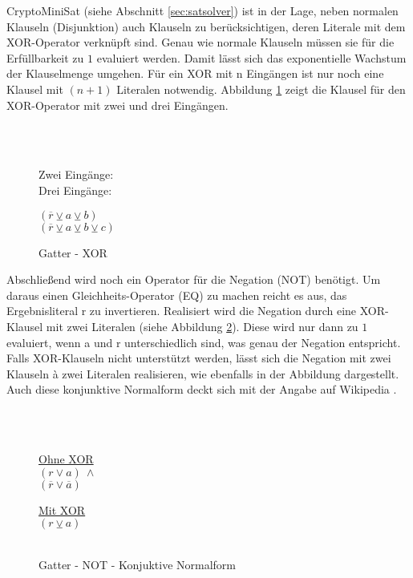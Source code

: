 CryptoMiniSat (siehe Abschnitt \ref{sec:satsolver}) ist in der Lage, neben normalen Klauseln (Disjunktion) auch Klauseln zu berücksichtigen, deren Literale
mit dem XOR-Operator verknüpft sind. Genau wie normale Klauseln müssen sie für die Erfüllbarkeit zu $1$ evaluiert werden. Damit lässt sich das exponentielle
Wachstum der Klauselmenge umgehen. Für ein XOR mit n Eingängen ist nur noch eine Klausel mit $ (n + 1) $ Literalen notwendig. Abbildung \ref{fig:gatter_cnf_xor}
zeigt die Klausel für den XOR-Operator mit zwei und drei Eingängen.
\begin{figure}[!h]
  \centering
  \begin{minipage}[l]{1cm}
    ~\\
    ~
  \end{minipage}
  \begin{minipage}[l]{2.5cm}
    Zwei Eingänge:\\
    Drei Eingänge:
  \end{minipage}
  \begin{minipage}[l]{3cm}
    $ (\overline{r} \veebar a \veebar b) $\\
    $ (\overline{r} \veebar a \veebar b \veebar c) $
  \end{minipage}
  \caption{Gatter - XOR}
  \label{fig:gatter_cnf_xor}
\end{figure}

Abschließend wird noch ein Operator für die Negation (NOT) benötigt. Um daraus einen Gleichheits-Operator (EQ) zu machen reicht es aus, das Ergebnisliteral r zu invertieren.
Realisiert wird die Negation durch eine XOR-Klausel mit zwei Literalen (siehe Abbildung \ref{fig:gatter_not_cnf}). Diese wird nur dann zu $1$ evaluiert, wenn
a und r unterschiedlich sind, was genau der Negation entspricht. Falls XOR-Klauseln nicht unterstützt werden, lässt sich die Negation mit zwei Klauseln à zwei
Literalen realisieren, wie ebenfalls in der Abbildung dargestellt. Auch diese konjunktive Normalform deckt sich mit der Angabe auf Wikipedia \cite{wiki:tseitin}.
\begin{figure}[!h]
  \centering
  \begin{minipage}[l]{1cm}
    ~\\
    ~
  \end{minipage}
  \begin{minipage}[l]{2.5cm}
    \underline{Ohne XOR}\\
    $ (r \vee a) ~ \wedge $\\
    $ (\overline{r} \vee \overline{a}) $
  \end{minipage}
  \begin{minipage}[l]{2.5cm}
    \underline{Mit XOR}\\
    $ (r \veebar a) $\\
    ~
  \end{minipage}
  \caption{Gatter - NOT - Konjuktive Normalform}
  \label{fig:gatter_not_cnf}
\end{figure}